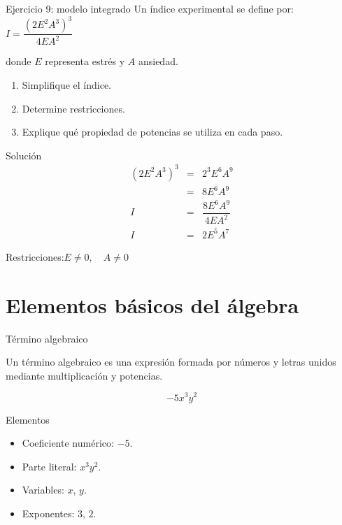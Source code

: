 \documentclass[handout,aspectratio=169]{beamer}
\begin{document}
	\begin{frame}{Ejercicio 9: modelo integrado}
		Un índice experimental se define por: $	I=\dfrac{(2E^2A^3)^3}{4EA^2}$
		
		donde \(E\) representa estrés y \(A\) ansiedad.
		
		\begin{enumerate}
			\item Simplifique el índice.
			\item Determine restricciones.
			\item Explique qué propiedad de potencias se utiliza en cada paso.
		\end{enumerate}
		
		\pause
		
		\begin{block}{Solución}
			\[
			\begin{array}{rcl}
				(2E^2A^3)^3 & = & 2^3E^6A^9 \\[0.3cm]
				& = & 8E^6A^9 \\[0.3cm]
				I           & = & \dfrac{8E^6A^9}{4EA^2} \\[0.3cm]
				I           & = & 2E^5A^7
			\end{array}
			\]
			
			Restricciones:$	E\neq0,\quad A\neq0$
		\end{block}
	\end{frame}
	
	\section{Elementos básicos del álgebra}
		
	\begin{frame}{Término algebraico}
		\begin{idea}
			Un término algebraico es una expresión formada por números y letras unidos mediante multiplicación y potencias.
		\end{idea}
		
		\[
		-5x^3y^2
		\]
		
		\pause
		
		\begin{block}{Elementos}
			\begin{itemize}
				\item Coeficiente numérico: \(-5\).
				\item Parte literal: \(x^3y^2\).
				\item Variables: \(x\), \(y\).
				\item Exponentes: \(3\), \(2\).
			\end{itemize}
		\end{block}
		
		\pause
		
	\end{frame}
	
\end{document}
